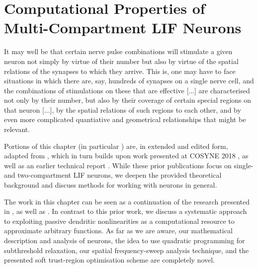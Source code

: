 \chapter{Computational Properties of Multi-Compartment LIF Neurons}
\label{chp:nlif}

\vspace{30pt}

\begin{OpeningQuote}
It may well be that certain nerve pulse combinations will stimulate a given neuron not simply by virtue of their number but also by virtue of the spatial relations of the synapses to which they arrive. This is, one may have to face situations in which there are, say, hundreds of synapses on a single nerve cell, and the combinations of stimulations on these that are effective [...] are characterised not only by their number, but also by their coverage of certain special regions on that neuron [...], by the spatial relations of such regions to each other, and by even more complicated quantiative and geometrical relationships that might be relevant.
\end{OpeningQuote}

\vspace{10pt}

\begin{PriorPublication}
Portions of this chapter (in particular ) are, in extended and edited form, adapted from \citet{stoeckel2021}, which in turn builds upon work presented at COSYNE 2018 \citep{stockel2018nonlinear}, as well as an earlier technical report \citep{stockel2017point}.
While these prior publications focus on single- and two-compartment LIF neurons, we deepen the provided theoretical background and discuss methods for working with \nlif neurons in general.
\end{PriorPublication}

\begin{Contributions}
The work in this chapter can be seen as a continuation of the research presented in \citet[Chapter~5]{koch1999biophysics}, as well as \citet[Chapter~4]{tripp2009search}.
In contrast to this prior work, we discuss a systematic approach to exploiting passive dendritic nonlinearities as a computational resource to approximate arbitrary functions.
As far as we are aware, our mathematical description and analysis of \nlif neurons, the idea to use quadratic programming for subthreshold relaxation, our spatial frequency-sweep analysis technique, and the presented soft trust-region optimisation scheme are completely novel.
\end{Contributions}

